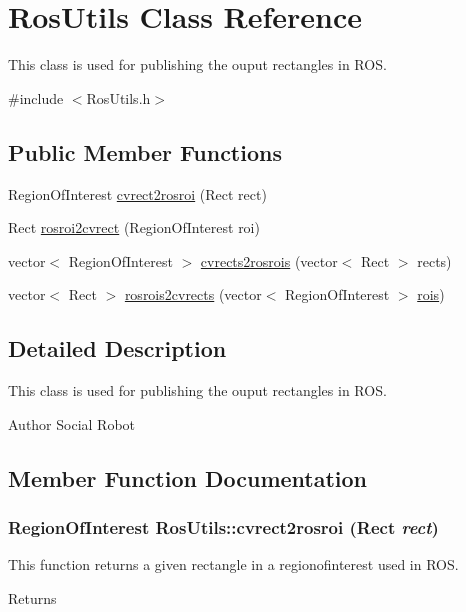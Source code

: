 \hypertarget{classRosUtils}{
\section{RosUtils Class Reference}
\label{classRosUtils}
}


This class is used for publishing the ouput rectangles in ROS.  




{\ttfamily \#include $<$RosUtils.h$>$}

\subsection*{Public Member Functions}
\begin{DoxyCompactItemize}
\item 
RegionOfInterest \hyperlink{classRosUtils_a14c90d8ff6c7a2eb6d030226cc19cf7e}{cvrect2rosroi} (Rect rect)
\item 
Rect \hyperlink{classRosUtils_af79ad6781024a9d081fdc8cf67782269}{rosroi2cvrect} (RegionOfInterest roi)
\item 
vector$<$ RegionOfInterest $>$ \hyperlink{classRosUtils_a10a6552d95ab7a6ee4122af4c4137523}{cvrects2rosrois} (vector$<$ Rect $>$ rects)
\item 
vector$<$ Rect $>$ \hyperlink{classRosUtils_aadb640f35f26394dfd6240b17c95c942}{rosrois2cvrects} (vector$<$ RegionOfInterest $>$ \hyperlink{social__robot__onethread_8cpp_acb84e343c5602756e13a851a44128639}{rois})
\end{DoxyCompactItemize}


\subsection{Detailed Description}
This class is used for publishing the ouput rectangles in ROS. \begin{DoxyAuthor}{Author}
Social Robot 
\end{DoxyAuthor}


\subsection{Member Function Documentation}
\hypertarget{classRosUtils_a14c90d8ff6c7a2eb6d030226cc19cf7e}{
\subsubsection[{cvrect2rosroi}]{\setlength{\rightskip}{0pt plus 5cm}RegionOfInterest RosUtils::cvrect2rosroi (Rect {\em rect})}}
\label{classRosUtils_a14c90d8ff6c7a2eb6d030226cc19cf7e}
This function returns a given rectangle in a regionofinterest used in ROS. \begin{DoxyReturn}{Returns}

\end{DoxyReturn}

